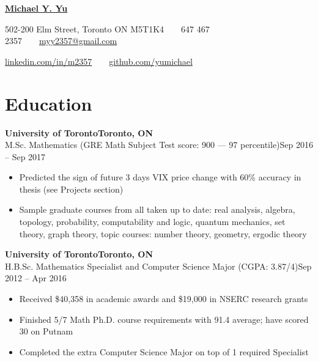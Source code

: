 \documentclass[10pt,letterpaper]{article}
\newcommand*\textmb[1]{\fontseries{b}\selectfont#1\fontseries{m}\selectfont}
\newcommand*\company[1]{\textbf{#1}}
\newcommand*\position[1]{\textmb{#1}}
\newcommand*\location\company
\newcommand*\timespan\position
\begin{document}
\pagestyle{empty}
\begin{center}
{\huge\textbf{\href{https://github.com/yumichael/resume-v5}{Michael Y. Yu}}}

502-200 Elm Street, Toronto ON M5T1K4\ \ \textbullet\ \ 647 467 2357\ \ \textbullet\ \ \href{mailto:myy2357@gmail.com}{myy2357@gmail.com}

\href{https://www.linkedin.com/in/m2357/}{linkedin.com/in/m2357}\ \ \textbullet\ \ \href{https://github.com/yumichael}{github.com/yumichael}
\end{center}
\section*{Education}
\company{University of Toronto}\hfill\location{Toronto, ON}\\
\position{M.Sc. Mathematics} (GRE Math Subject Test score: 900 --- 97 percentile)\hfill\timespan{Sep 2016 -- Sep 2017}
\begin{itemize}
\item Predicted the sign of future 3 days VIX price change with 60\% accuracy in thesis (see Projects section)
\item Sample graduate courses from all taken up to date: real analysis, algebra, topology, probability, computability and logic, quantum mechanics, set theory, graph theory, topic courses: number theory, geometry, ergodic theory
\end{itemize}
\company{University of Toronto}\hfill\location{Toronto, ON}\\
\position{H.B.Sc. Mathematics Specialist and Computer Science Major} (CGPA: 3.87/4)\hfill\timespan{Sep 2012 -- Apr 2016}
\begin{itemize}
\item Received \$40,358 in academic awards and \$19,000 in NSERC research grants
\item Finished 5/7 Math Ph.D. course requirements with 91.4 average; have scored 30 on Putnam
\item Completed the extra Computer Science Major on top of 1 required Specialist
\end{itemize}
\end{document}
